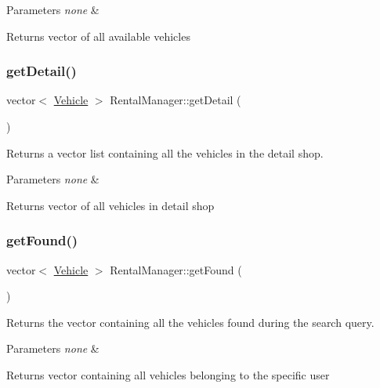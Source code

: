 \begin{DoxyParams}{Parameters}
{\em none} & \\
\hline
\end{DoxyParams}
\begin{DoxyReturn}{Returns}
vector of all available vehicles 
\end{DoxyReturn}
\mbox{\label{class_rental_manager_a9fb595d425dc7d770b1a506be4895fd2}} 
\subsubsection{\texorpdfstring{get\+Detail()}{getDetail()}}
{\footnotesize\ttfamily vector$<$ \hyperlink{class_vehicle}{Vehicle} $>$ Rental\+Manager\+::get\+Detail (\begin{DoxyParamCaption}{ }\end{DoxyParamCaption})}

Returns a vector list containing all the vehicles in the detail shop.


\begin{DoxyParams}{Parameters}
{\em none} & \\
\hline
\end{DoxyParams}
\begin{DoxyReturn}{Returns}
vector of all vehicles in detail shop 
\end{DoxyReturn}
\mbox{\label{class_rental_manager_ad6c19e6ea5a6d78fe010fe4ec577e4e5}} 
\subsubsection{\texorpdfstring{get\+Found()}{getFound()}}
{\footnotesize\ttfamily vector$<$ \hyperlink{class_vehicle}{Vehicle} $>$ Rental\+Manager\+::get\+Found (\begin{DoxyParamCaption}{ }\end{DoxyParamCaption})}

Returns the vector containing all the vehicles found during the search query.


\begin{DoxyParams}{Parameters}
{\em none} & \\
\hline
\end{DoxyParams}
\begin{DoxyReturn}{Returns}
vector containing all vehicles belonging to the specific user 
\end{DoxyReturn}
\mbox{\label{class_rental_manager_af1d5c4eb5b893fbec7c87610a11b6da4}} 
